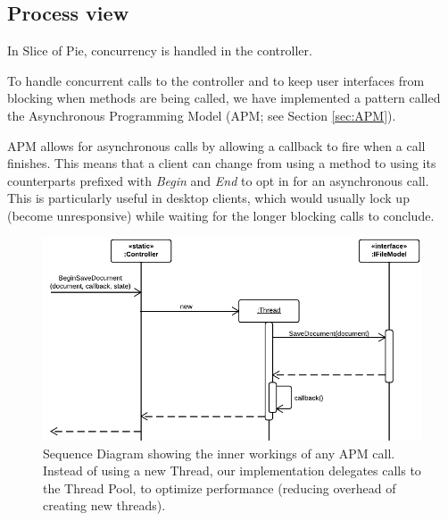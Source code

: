 \subsection{Process view}

In Slice of Pie, concurrency is handled in the controller.

To handle concurrent calls to the controller and to keep user interfaces from blocking when methods
are being called, we have implemented a pattern called the Asynchronous Programming Model (APM; see
Section \ref{sec:APM}).

APM allows for asynchronous calls by allowing a callback to fire when a call finishes. This means that
a client can change from using a method to using its counterparts prefixed with \emph{Begin} and
\emph{End} to opt in for an asynchronous call. This is particularly useful in desktop clients, which
would usually lock up (become unresponsive) while waiting for the longer blocking calls to conclude.

\begin{figure}[htb]
	\centering
	\includegraphics[width=1\textwidth]{Software_architecture/graphics/apm-sequence.png}
	\caption{Sequence Diagram showing the inner workings of any APM call. Instead of using a new Thread, our implementation
        delegates calls to the Thread Pool, to optimize performance (reducing overhead of creating new threads).}
	\label{fig:apm-sequence}
\end{figure}
